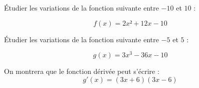 
\begin{questions}
	
	\question[4] \'Etudier les variations de la fonction suivante entre $-10$ et $10$ :
	
	\begin{equation*}
		f(x) = 2x²+12x - 10
	\end{equation*}
	
	\fillwithdottedlines{20cm}
	
	\question[6] \'Etudier les variations de la fonction suivante entre $-5$ et $5$ :
	
	\begin{equation*}
		g(x) = 3x^3- 36x - 10
	\end{equation*}
	
	On montrera que le fonction dérivée peut s'écrire :
	\begin{equation*}
		g'(x) = (3x+ 6) (3x-6)
	\end{equation*}
	
	\fillwithdottedlines{20cm}
\end{questions}